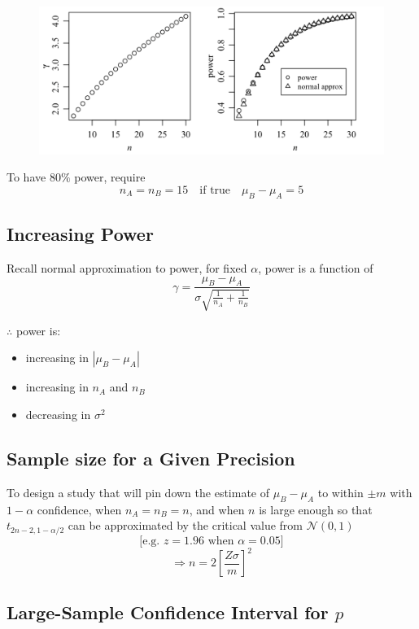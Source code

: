 \documentclass[14pt]{extarticle}
\begin{document}
\begin{figure}[H]
    \centering
    \includegraphics[width=1\textwidth]{fig5.png}
\end{figure}
\noindent To have $80\%$ power, require
\[
n_A = n_B = 15 \quad \text{if true} \quad \mu_B - \mu_A = 5
\]

\subsection*{Increasing Power}

Recall normal approximation to power, for fixed \(\alpha\), power is a function of
\[
\gamma = \frac{\mu_B - \mu_A}{\sigma \sqrt{\frac{1}{n_A} + \frac{1}{n_B}}}
\]

$\therefore$ power is:
\begin{itemize}
    \item increasing in \( |\mu_B - \mu_A| \)
    \item increasing in \(n_A\) and \(n_B\)
    \item decreasing in \(\sigma^2\)
\end{itemize}
\subsection*{Sample size for a Given Precision}

To design a study that will pin down the estimate of \( \mu_B - \mu_A \) to within \(\pm m\) with \(1 - \alpha\) confidence, when \(n_A = n_B = n\), and when \(n\) is large enough so that \(t_{2n-2, 1 - \alpha / 2}\) can be approximated by the critical value from \(\mathcal{N}(0, 1)\) 
\[\text{[e.g. } z = 1.96 \text{ when } \alpha = 0.05]\]
\[
\Rightarrow n = 2 \left[ \frac{Z \sigma}{m} \right]^2
\]

\subsection*{Large-Sample Confidence Interval for \( p \)}
\end{document}
